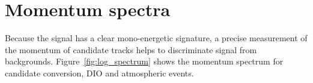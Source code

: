 



\section{Momentum spectra}
Because the signal has a clear mono-energetic signature, a precise measurement
of the momentum of candidate tracks helps to discriminate signal from
backgrounds. Figure~\ref{fig:log_spectrum} shows the momentum spectrum
for candidate conversion, DIO and atmospheric events.


